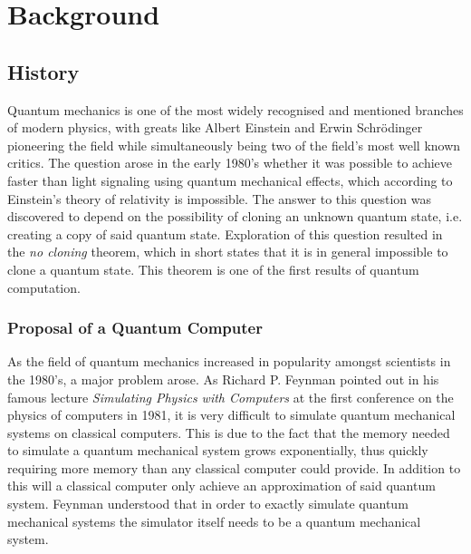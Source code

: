 \section{Background}

\subsection{History} %
Quantum mechanics is one of the most widely recognised and mentioned branches of modern physics, with greats like Albert Einstein and Erwin Schrödinger pioneering the field while simultaneously being two of the field's most well known critics. %
The question arose in the early 1980's whether it was possible to achieve faster than light signaling using quantum mechanical effects, which according to Einstein's theory of relativity is impossible\cite{niel_chang}. %
The answer to this question was discovered to depend on the possibility of cloning an unknown quantum state, i.e. creating a copy of said quantum state. Exploration of this question resulted in the \textit{no cloning} theorem, which in short states that it is in general impossible to clone a quantum state. This theorem is one of the first results of quantum computation\cite{niel_chang}. 

\subsubsection{Proposal of a Quantum Computer}
As the field of quantum mechanics increased in popularity amongst scientists in the 1980's, a major problem arose. As Richard P. Feynman pointed out in his famous lecture \textit{Simulating Physics with Computers}\cite{feyn} at the first conference on the physics of computers in 1981\cite{brief}, it is very difficult to simulate quantum mechanical systems on classical computers. This is due to the fact that the memory needed to simulate a quantum mechanical system grows exponentially, thus quickly requiring more memory than any classical computer could provide\cite{feyn}. In addition to this will a classical computer only achieve an approximation of said quantum system. Feynman understood that in order to exactly simulate quantum mechanical systems the simulator itself needs to be a quantum mechanical system\cite{feyn}. 

